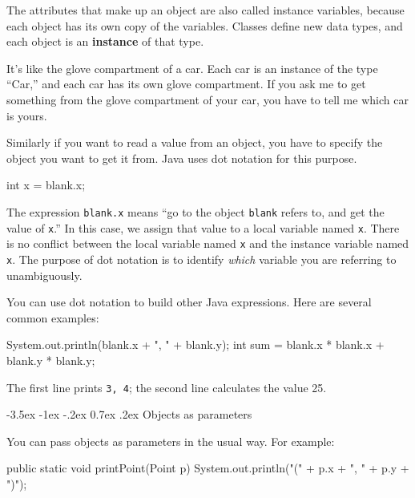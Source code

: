 \documentclass[12pt]{book}
\makeatletter
\theoremstyle{exercise}
\newcommand{\java}[1]{\verb"#1"}
\renewcommand{\section}{\@startsection {section}{1}{\z@}%
    {-3.5ex \@plus -1ex \@minus -.2ex}%
    {0.7ex \@plus.2ex}%
    {\normalfont\Large\bfseries}}
\newcommand{\java}[1]{\lstinline{#1}} %
\makeatother
\begin{document}

The attributes that make up an object are also called instance variables, because each object has its own copy of the variables.
Classes define new data types, and each object is an {\bf instance} of that type.

It's like the glove compartment of a car.
Each car is an instance of the type ``Car,'' and each car has its own glove compartment.
If you ask me to get something from the glove compartment of your car, you have to tell me which car is yours.


Similarly if you want to read a value from an object, you have to specify the object you want to get it from.
Java uses dot notation for this purpose.

\begin{code}
    int x = blank.x;
\end{code}

The expression \java{blank.x} means ``go to the object \java{blank} refers to, and get the value of \java{x}.''
In this case, we assign that value to a local variable named \java{x}.
There is no conflict between the local variable named \java{x} and the instance variable named \java{x}.
The purpose of dot notation is to identify {\em which} variable you are referring to unambiguously.

You can use dot notation to build other Java expressions.
Here are several common examples:

\begin{code}
    System.out.println(blank.x + ", " + blank.y);
    int sum = blank.x * blank.x + blank.y * blank.y;
\end{code}

The first line prints {\tt 3, 4}; the second line calculates the value 25.


\section{Objects as parameters}


You can pass objects as parameters in the usual way.
For example:

\begin{code}
    public static void printPoint(Point p) {
        System.out.println("(" + p.x + ", " + p.y + ")");
    }
\end{code}
\end{document}
